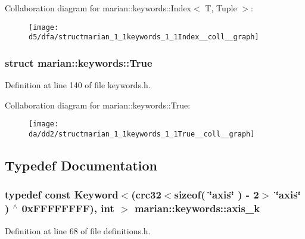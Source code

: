 Collaboration diagram for marian\+:\+:keywords\+:\+:Index$<$ T, Tuple $>$\+:
\nopagebreak
\begin{figure}[H]
\begin{center}
\leavevmode
\texttt{[image: d5/dfa/structmarian\_1\_1keywords\_1\_1Index\_\_coll\_\_graph]}
\end{center}
\end{figure}
\label{structmarian_1_1keywords_1_1True}
\hypertarget{namespacemarian_1_1keywords_structmarian_1_1keywords_1_1True}{}
\subsubsection{struct marian\+:\+:keywords\+:\+:True}


Definition at line 140 of file keywords.\+h.



Collaboration diagram for marian\+:\+:keywords\+:\+:True\+:
\nopagebreak
\begin{figure}[H]
\begin{center}
\leavevmode
\texttt{[image: da/dd2/structmarian\_1\_1keywords\_1\_1True\_\_coll\_\_graph]}
\end{center}
\end{figure}


\subsection{Typedef Documentation}
\subsubsection[{\texorpdfstring{axis\+\_\+k}{axis_k}}]{\setlength{\rightskip}{0pt plus 5cm}typedef const {\bf Keyword}$<$({\bf crc32}$<$sizeof( \char`\"{}axis\char`\"{} ) -\/ 2$>$ \char`\"{}{\bf axis}\char`\"{} ) $^\wedge$ 0x\+F\+F\+F\+F\+F\+F\+F\+F), int $>$ marian\+::keywords\+::axis\+\_\+k}\hypertarget{namespacemarian_1_1keywords_a10b8b729f40b2bc6f4b9d1f4486d03a4}{}\label{namespacemarian_1_1keywords_a10b8b729f40b2bc6f4b9d1f4486d03a4}


Definition at line 68 of file definitions.\+h.

